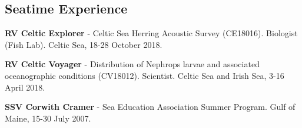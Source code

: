 \documentclass[a4paper]{deedy-resume} %
\begin{document}
\begin{flushleft}
\sectionspace %



\section{Seatime Experience}
\sectionspace

\begin{tightitemize}
\item \textbf{RV Celtic Explorer} - Celtic Sea Herring Acoustic Survey (CE18016). Biologist (Fish Lab). Celtic Sea, 18-28 October 2018. 
\item \textbf{RV Celtic Voyager} - Distribution of Nephrops larvae and associated oceanographic conditions (CV18012). Scientist. Celtic Sea and Irish Sea, 3-16 April 2018.
\item \textbf{SSV Corwith Cramer} - Sea Education Association Summer Program. Gulf of Maine, 15-30 July 2007.
\end{tightitemize}

\sectionspace %

\end{flushleft}
\end{document}
